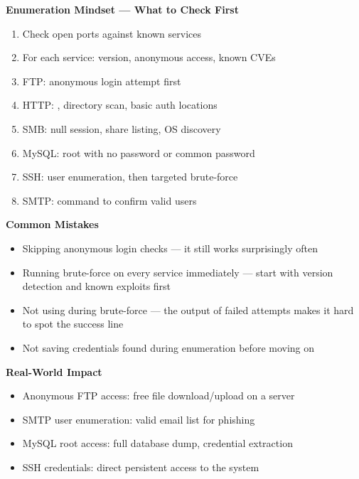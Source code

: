 \begin{notebox}
\begin{takebox}
\textbf{Enumeration Mindset --- What to Check First}
\begin{enumerate}
  \item Check open ports against known services
  \item For each service: version, anonymous access, known CVEs
  \item FTP: anonymous login attempt first
  \item HTTP: , directory scan, basic auth locations
  \item SMB: null session, share listing, OS discovery
  \item MySQL: root with no password or common password
  \item SSH: user enumeration, then targeted brute-force
  \item SMTP:  command to confirm valid users
\end{enumerate}

\textbf{Common Mistakes}
\begin{itemize}
  \item Skipping anonymous login checks --- it still works surprisingly often
  \item Running brute-force on every service immediately ---
        start with version detection and known exploits first
  \item Not using  during brute-force --- the output
        of failed attempts makes it hard to spot the success line
  \item Not saving credentials found during enumeration before moving on
\end{itemize}

\textbf{Real-World Impact}
\begin{itemize}
  \item Anonymous FTP access: free file download/upload on a server
  \item SMTP user enumeration: valid email list for phishing
  \item MySQL root access: full database dump, credential extraction
  \item SSH credentials: direct persistent access to the system
\end{itemize}
\end{takebox}

\end{notebox}